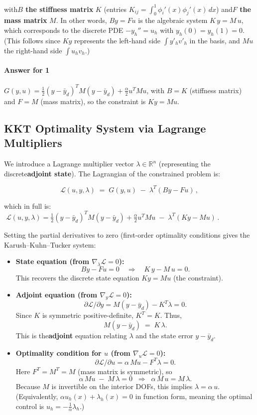 with\textbf{\(B\) the stiffness matrix} \(K\) (entries \(K_{ij}=\int_0^1 \phi_i'(x)\phi_j'(x)\,dx\)) and\textbf{\(F\) the mass matrix} \(M\).  In other words, \(By=Fu\) is the algebraic system \(K\,y = M\,u\), which corresponds to the discrete PDE \(-y_h''=u_h\) with \(y_h(0)=y_h(1)=0\). (This follows since \(K y\) represents the left-hand side \(\int y'_h v'_h\) in the basis, and \(M u\) the right-hand side \(\int u_h v_h\).)

\paragraph{Answer for 1}
\(G(y,u)=\frac12 (y-\bar y_d)^T M (y-\bar y_d) + \frac{\alpha}{2} u^T M u\), with \(B=K\) (stiffness matrix) and \(F=M\) (mass matrix), so the constraint is \(K y = M u\).

\subsection{KKT Optimality System via Lagrange Multipliers}

We introduce a Lagrange multiplier vector \(\lambda\in\mathbb{R}^n\) (representing the discrete\textbf{adjoint state}). The Lagrangian of the constrained problem is:

\[
	\mathcal{L}(u,y,\lambda) \;=\; G(y,u)\;-\;\lambda^T(B y - F u)\,,
\]

which in full is: \(\; \mathcal{L}(u,y,\lambda) = \frac{1}{2}(y-\bar y_d)^T M (y-\bar y_d) + \frac{\alpha}{2} u^T M u \;-\;\lambda^T(Ky - M u)\,. \)

Setting the partial derivatives to zero (first-order optimality conditions gives the Karush–Kuhn–Tucker system:

\begin{itemize}
	\item \textbf{State equation (from \(\nabla_\lambda \mathcal{L}=0\)):}
	      \[By - Fu = 0 \quad\Longrightarrow\quad K\,y - M\,u = 0.\]
	      This recovers the discrete state equation \(K y = M u\) (the constraint).
	\item \textbf{Adjoint equation (from \(\nabla_y \mathcal{L}=0\)):}
	      \[\partial \mathcal{L}/\partial y = M(y - \bar y_d) - K^T \lambda = 0.\]
	      Since \(K\) is symmetric positive-definite, \(K^T=K\). Thus,
	      \[M(y - \bar y_d) \;=\; K\,\lambda.\]
	      This is the\textbf{adjoint} equation relating \(\lambda\) and the state error \(y-\bar y_d\).

	\item \textbf{Optimality condition for \(u\) (from \(\nabla_u \mathcal{L}=0\)):}
	      \[\partial \mathcal{L}/\partial u = \alpha\, M u - F^T \lambda = 0.\]
	      Here \(F^T=M^T=M\) (mass matrix is symmetric), so
	      \[\alpha\, M u \;-\; M\,\lambda = 0 \;\;\Longrightarrow\;\; \alpha\,M\,u = M\,\lambda.\]
	      Because \(M\) is invertible on the interior DOFs, this implies \(\lambda = \alpha\,u\).  (Equivalently, \(\alpha u_h(x) + \lambda_h(x) = 0\) in function form, meaning the optimal control is \(u_h=-\frac{1}{\alpha}\lambda_h\).)
\end{itemize}

